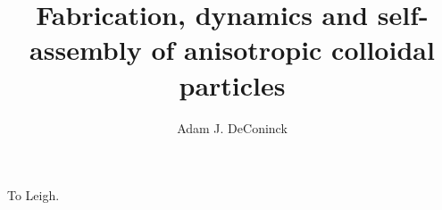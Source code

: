 \documentclass[12pt,fullpage,draftthesis,edeposit]{uiucthesis2009}
\begin{document}
\msthesis
{}
\title{Fabrication, dynamics and self-assembly of anisotropic colloidal particles}
\author{Adam J. DeConinck}

\maketitle

\frontmatter



\begin{dedication}
To Leigh.
\end{dedication}



\tableofcontents
\listoffigures
\listoftables

\mainmatter



%









\appendix



%

%

%

\backmatter

%



\end{document}
